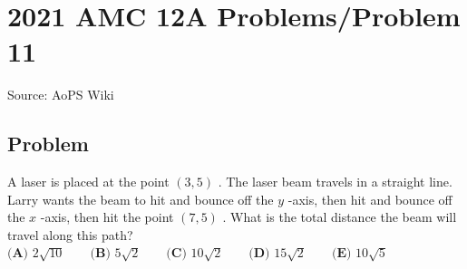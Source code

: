\documentclass[12pt]{article}
\begin{document}
\section*{{2021 AMC 12A Problems/Problem 11}}
Source: AoPS Wiki

\subsection*{Problem}
A laser is placed at the point $(3,5)$ . The laser beam travels in a straight line. Larry wants the beam to hit and bounce off the $y$ -axis, then hit and bounce off the $x$ -axis, then hit the point $(7,5)$ . What is the total distance the beam will travel along this path? $\textbf{(A) }2\sqrt{10} \qquad \textbf{(B) }5\sqrt2 \qquad \textbf{(C) }10\sqrt2 \qquad \textbf{(D) }15\sqrt2 \qquad \textbf{(E) }10\sqrt5$
\end{document}
